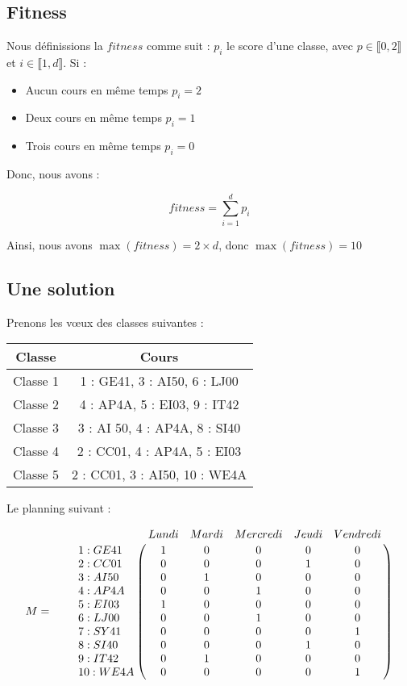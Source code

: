 \subsection{Fitness}

Nous définissions la $fitness$ comme suit : $p_i$ le score d'une classe, avec $p \in \llbracket 0 , 2 \rrbracket$ et $i \in \llbracket 1 , d \rrbracket$.
Si :
\begin{itemize}
    \item Aucun cours en même temps $p_i = 2$
    \item Deux cours en même temps $p_i = 1$
    \item Trois cours en même temps $p_i = 0$
\end{itemize}

Donc, nous avons :

\begin{equation}
    fitness = \sum_{i = 1}^{d} p_i\label{eq:fitness}
\end{equation}

Ainsi, nous avons $\max(fitness) = 2 \times d$, donc $\max(fitness) = 10$

\subsection{Une solution}

Prenons les v\oe ux des classes suivantes :

\begin{center}
    \begin{tabular}{|c|c|}
        \hline
        Classe   & Cours                         \\
        \hline
        Classe 1 & 1 : GE41, 3 : AI50, 6 : LJ00  \\
        \hline
        Classe 2 & 4 : AP4A, 5 : EI03, 9 : IT42  \\
        \hline
        Classe 3 & 3 : AI 50, 4 : AP4A, 8 : SI40 \\
        \hline
        Classe 4 & 2 : CC01, 4 : AP4A, 5 : EI03  \\
        \hline
        Classe 5 & 2 : CC01, 3 : AI50, 10 : WE4A \\
        \hline
    \end{tabular}
\end{center}

Le planning suivant :

\[
    M = \qquad \bordermatrix{~  & \tikzmark{harrowleft} Lundi & Mardi & Mercredi & Jeudi
    & Vendredi\tikzmark{harrowright}  \cr
    \tikzmark{varrowtop}
    1 : GE41 & 1 & 0 & 0 & 0 & 0 \cr
    2 : CC01 & 0 & 0 & 0 & 1 & 0 \cr
    3 : AI50 & 0 & 1 & 0 & 0 & 0 \cr
    4 : AP4A & 0 & 0 & 1 & 0 & 0 \cr
    5 : EI03 & 1 & 0 & 0 & 0 & 0 \cr
    6 : LJ00 & 0 & 0 & 1 & 0 & 0 \cr
    7 : SY41 & 0 & 0 & 0 & 0 & 1 \cr
    8 : SI40 & 0 & 0 & 0 & 1 & 0 \cr
    9 : IT42 & 0 & 1 & 0 & 0 & 0 \cr
    \tikzmark{varrowbottom} 10 : WE4A & 0 & 0 & 0 & 0 & 1 \cr
    }
\]

